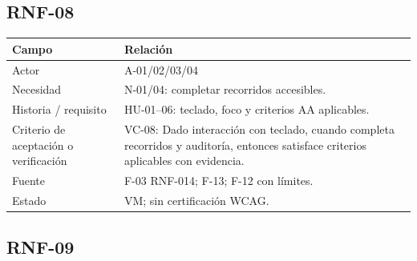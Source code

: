 \documentclass[12pt,a4paper]{report}
\begin{document}
\subsection{RNF-08}\label{matriz-RNF-08}

{\def\LTcaptype{none} %
\begin{longtable}[]{@{}
  >{\raggedright\arraybackslash}p{}
  >{\raggedright\arraybackslash}p{}@{}}
\toprule\noalign{}
\begin{minipage}[b]{\linewidth}\raggedright
Campo
\end{minipage} & \begin{minipage}[b]{\linewidth}\raggedright
Relación
\end{minipage} \\
\midrule\noalign{}
\endhead
\bottomrule\noalign{}
\endlastfoot
Actor & A-01/02/03/04 \\
Necesidad & N-01/04: completar recorridos accesibles. \\
Historia / requisito & HU-01--06: teclado, foco y criterios AA
aplicables. \\
Criterio de aceptación o verificación & VC-08: Dado interacción con
teclado, cuando completa recorridos y auditoría, entonces satisface
criterios aplicables con evidencia. \\
Fuente & F-03 RNF-014; F-13; F-12 con límites. \\
Estado & VM; sin certificación WCAG. \\
\end{longtable}
}

\subsection{RNF-09}\label{matriz-RNF-09}
\end{document}
